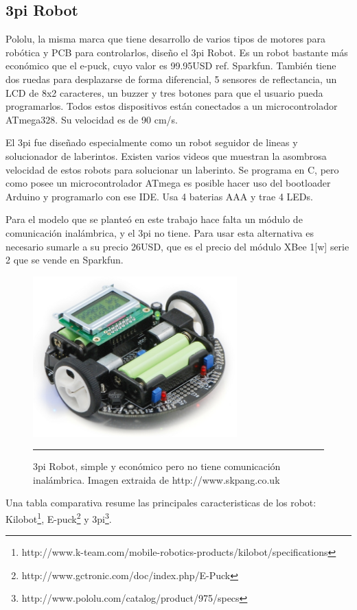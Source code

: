 \subsection{3pi Robot}

Pololu, la misma marca que tiene desarrollo de varios tipos de motores para robótica y PCB para controlarlos, diseño el 3pi Robot. Es un robot bastante más económico que el e-puck, cuyo valor es 99.95USD ref. Sparkfun. También tiene dos ruedas para desplazarse de forma diferencial, 5 sensores de reflectancia, un LCD de 8x2 caracteres, un buzzer y tres botones para que el usuario pueda programarlos. Todos estos dispositivos están conectados a un microcontrolador ATmega328. Su velocidad es de 90 cm/s.

El 3pi fue diseñado especialmente como un robot seguidor de lineas y solucionador de laberintos. Existen varios videos que muestran la asombrosa velocidad de estos robots para solucionar un laberinto. Se programa en C, pero como posee un microcontrolador ATmega es posible hacer uso del bootloader Arduino y programarlo con ese IDE. Usa 4 baterias AAA y trae 4 LEDs.

Para el modelo que se planteó en este trabajo hace falta un módulo de comunicación inalámbrica, y el 3pi no tiene. Para usar esta alternativa es necesario sumarle a su precio 26USD, que es el precio del módulo XBee 1[w] serie 2 que se vende en Sparkfun.

\begin{figure}[htbp]
	\centering
		\includegraphics[width=0.7\textwidth]{./Figures/3pi.jpg}
		\rule{35em}{0.5pt} 
	\caption[swarm]{3pi Robot, simple y económico pero no tiene comunicación inalámbrica. Imagen extraida de http://www.skpang.co.uk}
	\label{fig:3pi}
\end{figure}

Una tabla comparativa resume las principales caracteristicas de los robot: Kilobot\footnote{http://www.k-team.com/mobile-robotics-products/kilobot/specifications}, E-puck\footnote{http://www.gctronic.com/doc/index.php/E-Puck} y 3pi\footnote{http://www.pololu.com/catalog/product/975/specs}.

